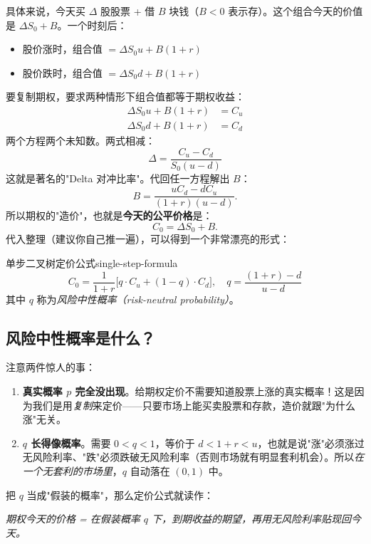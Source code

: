 \documentclass[11pt,a4paper]{ctexart}
\newcommand{\1}{\mathbf{1}}
\begin{document}
具体来说，今天买 $\Delta$ 股股票 + 借 $B$ 块钱（$B<0$ 表示存）。这个组合今天的价值是 $\Delta S_0 + B$。一个时刻后：
\begin{itemize}
    \item 股价涨时，组合值 $= \Delta S_0 u + B(1+r)$
    \item 股价跌时，组合值 $= \Delta S_0 d + B(1+r)$
\end{itemize}
要复制期权，要求两种情形下组合值都等于期权收益：
\begin{align*}
\Delta S_0 u + B(1+r) &= C_u \\
\Delta S_0 d + B(1+r) &= C_d
\end{align*}
两个方程两个未知数。两式相减：
\[
\boxed{\Delta = \frac{C_u - C_d}{S_0(u-d)}}
\]
这就是著名的"Delta 对冲比率"。代回任一方程解出 $B$：
\[
B = \frac{u C_d - d C_u}{(1+r)(u-d)}.
\]
所以期权的"造价"，也就是\textbf{今天的公平价格}是：
\[
C_0 = \Delta S_0 + B.
\]
代入整理（建议你自己推一遍），可以得到一个非常漂亮的形式：

\begin{idea}{单步二叉树定价公式}{single-step-formula}
\[
\boxed{C_0 = \frac{1}{1+r}\bigl[q\cdot C_u + (1-q)\cdot C_d\bigr]}, \quad
\boxed{q = \frac{(1+r) - d}{u - d}}
\]
其中 $q$ 称为\emph{风险中性概率（risk-neutral probability）}。
\end{idea}

\subsection{风险中性概率是什么？}

注意两件惊人的事：

\begin{enumerate}[leftmargin=*]
\item \textbf{真实概率 $p$ 完全没出现}。给期权定价不需要知道股票上涨的真实概率！这是因为我们是用\emph{复制}来定价——只要市场上能买卖股票和存款，造价就跟"为什么涨"无关。
\item \textbf{$q$ 长得像概率}。需要 $0 < q < 1$，等价于 $d < 1+r < u$，也就是说"涨"必须涨过无风险利率、"跌"必须跌破无风险利率（否则市场就有明显套利机会）。所以\emph{在一个无套利的市场里}，$q$ 自动落在 $(0,1)$ 中。
\end{enumerate}

把 $q$ 当成"假装的概率"，那么定价公式就读作：
\begin{center}
\itshape 期权今天的价格 = 在假装概率 $q$ 下，到期收益的期望，再用无风险利率贴现回今天。
\end{center}
\end{document}
